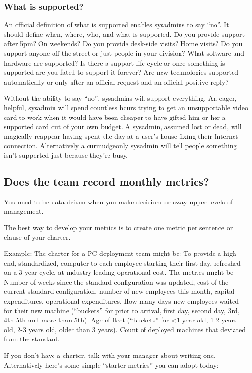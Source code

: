 \documentclass{article}
\begin{document}
\subsubsection*{What is supported?}
An official definition of what is supported enables sysadmins to say ``no''. It should define when, where, who, and what is supported. Do you provide support after 5pm? On weekends? Do you provide desk-side visits? Home visits? Do you support anyone off the street or just people in your division? What software and hardware are supported? Is there a support life-cycle or once something is supported are you fated to support it forever? Are new technologies supported automatically or only after an official request and an official positive reply?

Without the ability to say ``no'', sysadmins will support everything. An eager, helpful, sysadmin will spend countless hours trying to get an unsupportable video card to work when it would have been cheaper to have gifted him or her a supported card out of your own budget. A sysadmin, assumed lost or dead, will magically reappear having spent the day at a user's house fixing their Internet connection. Alternatively a curmudgeonly sysadmin will tell people something isn't supported just because they're busy.

\subsection{Does the team record monthly metrics?}
You need to be data-driven when you make decisions or sway upper levels of management.

The best way to develop your metrics is to create one metric per sentence or clause of your charter.

Example: The charter for a PC deployment team might be: To provide a high-end, standardized, computer to each employee starting their first day, refreshed on a 3-year cycle, at industry leading operational cost. The metrics might be: Number of weeks since the standard configuration was updated, cost of the current standard configuration, number of new employees this month, capital expenditures, operational expenditures. How many days new employees waited for their new machine (``buckets'' for prior to arrival, first day, second day, 3rd, 4th 5th and more than 5th). Age of fleet (``buckets'' for <1 year old, 1-2 years old, 2-3 years old, older than 3 years). Count of deployed machines that deviated from the standard.

If you don't have a charter, talk with your manager about writing one. Alternatively here's some simple ``starter metrics'' you can adopt today:
\end{document}

